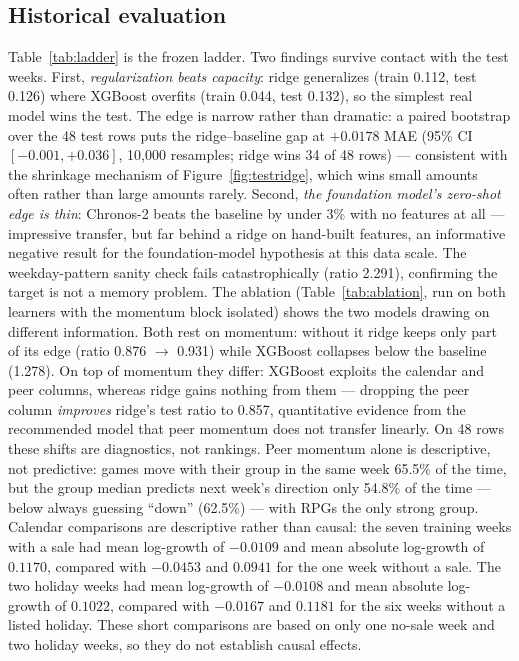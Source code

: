 \documentclass[10pt,letterpaper]{article}
\begin{document}
\subsection{Historical evaluation}
Table~\ref{tab:ladder} is the frozen ladder. Two findings survive contact with the test weeks. First, \emph{regularization beats capacity}: ridge generalizes (train 0.112, test 0.126) where XGBoost overfits (train 0.044, test 0.132), so the simplest real model wins the test. The edge is narrow rather than dramatic: a paired bootstrap over the 48 test rows puts the ridge--baseline gap at $+0.0178$ MAE (95\% CI $[-0.001, +0.036]$, 10{,}000 resamples; ridge wins 34 of 48 rows) --- consistent with the shrinkage mechanism of Figure~\ref{fig:testridge}, which wins small amounts often rather than large amounts rarely. Second, \emph{the foundation model's zero-shot edge is thin}: Chronos-2 beats the baseline by under 3\% with no features at all --- impressive transfer, but far behind a ridge on hand-built features, an informative negative result for the foundation-model hypothesis at this data scale. The weekday-pattern sanity check fails catastrophically (ratio 2.291), confirming the target is not a memory problem. The ablation (Table~\ref{tab:ablation}, run on both learners with the momentum block isolated) shows the two models drawing on different information. Both rest on momentum: without it ridge keeps only part of its edge (ratio 0.876 $\to$ 0.931) while XGBoost collapses below the baseline (1.278). On top of momentum they differ: XGBoost exploits the calendar and peer columns, whereas ridge gains nothing from them --- dropping the peer column \emph{improves} ridge's test ratio to 0.857, quantitative evidence from the recommended model that peer momentum does not transfer linearly. On 48 rows these shifts are diagnostics, not rankings. Peer momentum alone is descriptive, not predictive: games move with their group in the same week 65.5\% of the time, but the group median predicts next week's direction only 54.8\% of the time --- below always guessing ``down'' (62.5\%) --- with RPGs the only strong group. Calendar comparisons are descriptive rather than causal: the seven training weeks with a sale had mean log-growth of $-0.0109$ and mean absolute log-growth of $0.1170$, compared with $-0.0453$ and $0.0941$ for the one week without a sale. The two holiday weeks had mean log-growth of $-0.0108$ and mean absolute log-growth of $0.1022$, compared with $-0.0167$ and $0.1181$ for the six weeks without a listed holiday. These short comparisons are based on only one no-sale week and two holiday weeks, so they do not establish causal effects.
\end{document}
